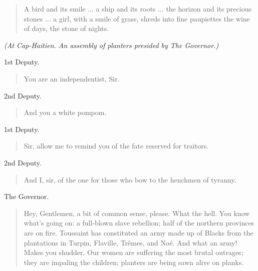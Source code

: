 \documentclass[letterpaper,article,12pt,oneside,notitlepage]{memoir}
\begin{document}
\begin{verse}
\indent A bird and its smile ... a ship and its roots ... the horizon and its precious stones ... a girl, with a smile of grass, shreds into fine paupiettes the wine of days, the stone of nights. \\
\end{verse}

\textit{(At Cap-Haitien. An assembly of planters presided by The Governor.)}

\begin{center}1st Deputy.\end{center}

\begin{verse}
\hspace{1cm} You are an independentist, Sir. \\
\end{verse}

\begin{center}2nd Deputy.\end{center}

\begin{verse}
\hspace{1cm} And you a white pompom. \\
\end{verse}

\begin{center}1st Deputy.\end{center}

\begin{verse}
\hspace{1cm} Sir, allow me to remind you of the fate reserved for traitors. \\
\end{verse}

\begin{center}2nd Deputy.\end{center}

\begin{verse}
\hspace{1cm} And I, sir, of the one for those who bow to the henchmen of tyranny. \\
\end{verse}

\begin{center}The Governor.\end{center}

\begin{verse}
\indent Hey, Gentlemen, a bit of common sense, please. What the hell. You know what's going on: a full-blown slave rebellion; half of the northern provinces are on fire. Toussaint has constituted an army made up of Blacks from the plantations in Turpin, Flaville, Trêmes, and Noé. And what an army! Makes you shudder. Our women are suffering the most brutal outrages; they are impaling the children; planters are being sawn alive on planks. \\
\end{verse}
\end{document}

